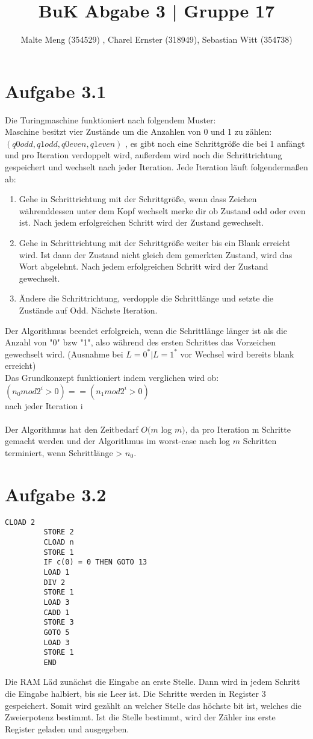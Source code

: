 \documentclass{article}
\title{BuK Abgabe 3 | Gruppe 17}
\author{Malte Meng (354529) , Charel Ernster (318949), Sebastian Witt (354738)}
\begin{document}
	\maketitle 
	\section[a 3.1]{Aufgabe 3.1}
	Die Turingmaschine funktioniert nach folgendem Muster:\\
	Maschine besitzt vier Zustände um die Anzahlen von 0 und 1 zu zählen:\\ $(q0odd,q1odd,q0even,q1even)$ , es gibt noch eine Schrittgröße die bei 1 anfängt und pro Iteration verdoppelt wird, außerdem wird noch die Schrittrichtung gespeichert und wechselt nach jeder Iteration.
	Jede Iteration läuft folgendermaßen ab:
	\begin{enumerate}
		\item Gehe in Schrittrichtung mit der Schrittgröße, wenn dass Zeichen währenddessen unter dem Kopf wechselt merke dir ob Zustand odd oder even ist. Nach jedem erfolgreichen Schritt wird der Zustand gewechselt.
		\item Gehe in Schrittrichtung mit der Schrittgröße weiter bis ein Blank erreicht wird. Ist dann der Zustand nicht gleich dem gemerkten Zustand, wird das Wort abgelehnt. Nach jedem erfolgreichen Schritt wird der Zustand gewechselt.
		\item Ändere die Schrittrichtung, verdopple die Schrittlänge und setzte die Zustände auf Odd. Nächste Iteration.
	\end{enumerate}
	 Der Algorithmus beendet erfolgreich, wenn die Schrittlänge länger ist als die Anzahl von "0" bzw "1", also während des ersten Schrittes das Vorzeichen gewechselt wird.  (Ausnahme bei $L = 0^* | L = 1^*$ vor Wechsel wird bereits blank erreicht)\\
	 Das Grundkonzept funktioniert indem verglichen wird ob:\\ $(n_0 mod 2^i > 0) == (n_1 mod 2^i > 0)$\\ nach jeder Iteration i\\\\
	 Der Algorithmus hat den Zeitbedarf $O(m$ log $m)$, da pro Iteration m Schritte gemacht werden und der Algorithmus im worst-case nach log $m$ Schritten terminiert, wenn Schrittlänge > $n_0$.\pagebreak
	 \section[a 3.2]{Aufgabe 3.2}
	 \lstset{
	 	numbers=left,
	 	stepnumber=1,     
	 	numberfirstline=false
	 }
	 \begin{lstlisting}[title="RAM Zweierlogarithmus"]
		 CLOAD 2
		 STORE 2
		 CLOAD n
		 STORE 1
		 IF c(0) = 0 THEN GOTO 13
		 LOAD 1
		 DIV 2
		 STORE 1
		 LOAD 3
		 CADD 1
		 STORE 3
		 GOTO 5
		 LOAD 3
		 STORE 1
		 END
	 \end{lstlisting}
	 Die RAM Läd zunächst die Eingabe an erste Stelle.
	 Dann wird in jedem Schritt die Eingabe halbiert, bis sie Leer ist.
	 Die Schritte werden in Register 3 gespeichert. 
	 Somit wird gezählt an welcher Stelle das höchste bit ist, welches die Zweierpotenz bestimmt.
	 Ist die Stelle bestimmt, wird der Zähler ins erste Register geladen und ausgegeben.
\end{document}
